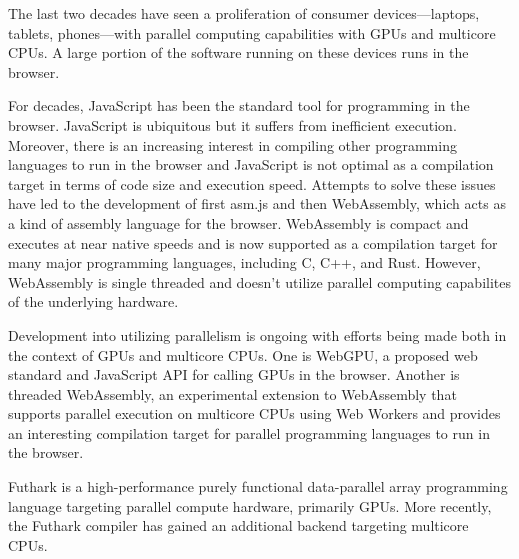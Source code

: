 \documentclass[11pt]{book}
\begin{document}
The last two decades have seen a proliferation  of consumer devices---laptops, tablets, phones---with parallel computing capabilities with GPUs and multicore CPUs. A large portion of the software running on these devices runs in the browser. 








For decades, JavaScript has been the standard tool for programming in the browser.
JavaScript is ubiquitous but it suffers from inefficient execution. Moreover, there is an increasing interest in compiling other programming languages to run in the browser and JavaScript is not optimal as a compilation target in terms of code size and execution speed. Attempts to solve these issues have led to the development of first asm.js and then WebAssembly, which acts as a kind of assembly language for the browser. WebAssembly is compact and executes at near native speeds and is now supported as a compilation target for many major programming languages, including C, C++, and Rust.
However, WebAssembly is single threaded and doesn't utilize parallel computing capabilites of the underlying hardware.

Development into utilizing parallelism is ongoing with efforts being made both in the context of GPUs and multicore CPUs. One is WebGPU, a proposed web standard and JavaScript API  for calling GPUs in the browser. Another is threaded WebAssembly, an experimental extension to WebAssembly that supports parallel execution on multicore CPUs using Web Workers and provides an interesting compilation target for parallel programming languages to run in the browser.


Futhark is a high-performance purely functional data-parallel array programming language targeting parallel compute hardware, primarily GPUs. More recently, the Futhark compiler has gained an additional backend targeting multicore CPUs. 
\end{document}
